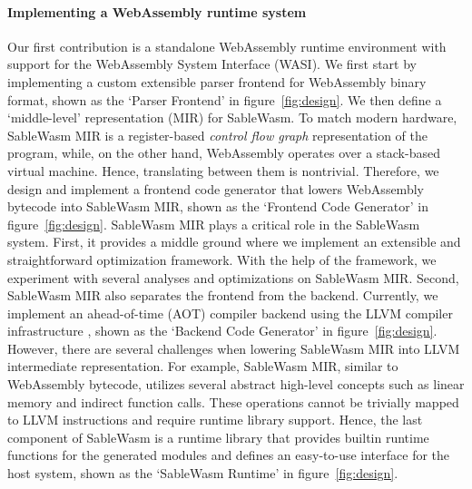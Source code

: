 \paragraph{Implementing a WebAssembly runtime system}
Our first contribution is a standalone WebAssembly runtime environment with
support for the WebAssembly System Interface (WASI). We first start by
implementing a custom extensible parser frontend for WebAssembly binary format,
shown as the `Parser Frontend' in figure~\ref{fig:design}.
We then define a `middle-level' representation (MIR) for SableWasm.
To match modern hardware, SableWasm MIR is a register-based
\emph{control flow graph} representation of the program, while, on the
other hand, WebAssembly operates over a stack-based virtual machine. Hence,
translating between them is nontrivial. Therefore, we design and implement a
frontend code generator that lowers WebAssembly bytecode into SableWasm MIR,
shown as the `Frontend Code Generator' in figure~\ref{fig:design}.
SableWasm MIR plays a critical role in the SableWasm system. First, it
provides a middle ground where we implement an extensible and straightforward
optimization framework. With the help of the framework, we experiment with
several analyses and optimizations on SableWasm MIR. Second,
SableWasm MIR also separates the frontend from the backend. Currently, we
implement an ahead-of-time (AOT) compiler backend using the LLVM compiler
infrastructure \cite{llvm-thesis}, shown as the `Backend Code Generator' in
figure~\ref{fig:design}. However, there are several challenges when lowering
SableWasm MIR into LLVM intermediate representation. For example, SableWasm MIR,
similar to WebAssembly bytecode, utilizes several abstract high-level concepts
such as linear memory and indirect function calls. These operations cannot be
trivially mapped to LLVM instructions and require runtime library support.
Hence, the last component of SableWasm is a runtime library that provides
builtin runtime functions for the generated modules and defines an easy-to-use
interface for the host system, shown as the `SableWasm Runtime' in
figure~\ref{fig:design}.

